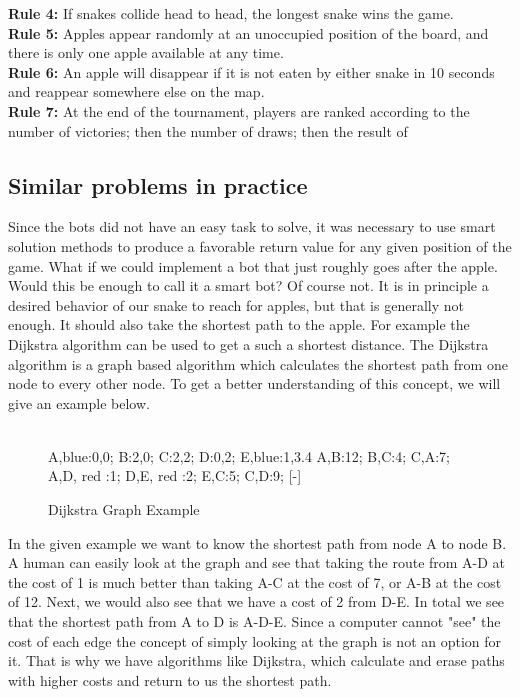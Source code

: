 \documentclass[a4paper,12pt]{article}
\begin{document}
\textbf{Rule 4:} If snakes collide head to head, the longest snake wins the game.\\
\textbf{Rule 5:} Apples appear randomly at an unoccupied position of the board, and there is only
one apple available at any time.\\
\textbf{Rule 6:} An apple will disappear if it is not eaten by either snake in 10 seconds and reappear
somewhere else on the map.\\
\textbf{Rule 7:} At the end of the tournament, players are ranked according to the number of
victories; then the number of draws; then the result of\\

\subsection{Similar problems in practice}
Since the bots did not have an easy task to solve, it was necessary to use smart solution methods to produce a favorable return value for any given position of the game. What if we could implement a bot that just roughly goes after the apple. Would this be enough to call it a smart bot? Of course not. It is in principle a desired behavior of our snake to reach for apples, but that is generally not enough. It should also take the shortest path to the apple. For example the Dijkstra algorithm can be used to get a such a shortest distance. The Dijkstra algorithm is a graph based algorithm which calculates the shortest path from one node to every other node. To get a better understanding of this concept, we will give an example below.\\
\\
\begin{figure}[H]
\centering
{}
{
A,blue:0,0;
B:2,0;
C:2,2;
D:0,2;
E,blue:1,3.4
}
{
A,B:12;
B,C:4;
C,A:7; 
A,D, red :1;
D,E, red :2; 
E,C:5;
C,D:9;
}[-]
\mygraph{}
\caption{Dijkstra Graph Example}
\end{figure}
In the given example we want to know the shortest path from node A to node B. A human can easily look at the graph and see that taking the route from A-D at the cost of 1 is much better than taking A-C at the cost of 7, or A-B at the cost of 12. Next, we would also see that we have a cost of 2 from D-E. In total we see that the shortest path from A to D is A-D-E. Since a computer cannot "see" the cost of each edge the concept of simply looking at the graph is not an option for it. That is why we have algorithms like Dijkstra, which calculate and erase paths with higher costs and return to us the shortest path.\\
\end{document}
